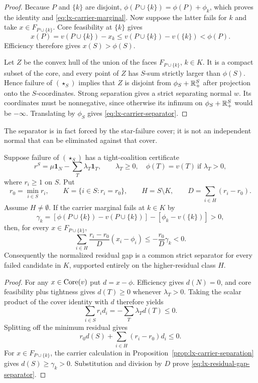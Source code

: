\begin{proof}
Because $P$ and $\{k\}$ are disjoint,
$\phi(P\cup\{k\})=\phi(P)+\phi_k$, which proves the identity and
\eqref{eq:lx-carrier-marginal}.  Now suppose the latter fails for $k$ and
take $x\in F_{P\cup\{k\}}$.  Core feasibility at $\{k\}$ gives
\[
 x(P)=v(P\cup\{k\})-x_k
 \leq v(P\cup\{k\})-v(\{k\})<\phi(P).
\]
Efficiency therefore gives $x(S)>\phi(S)$.

Let $Z$ be the convex hull of the union of the faces
$F_{P\cup\{k\}}$, $k\in K$.  It is a compact subset of the core, and every
point of $Z$ has $S$-sum strictly larger than $\phi(S)$.  Hence failure of
$(\star_S)$ implies that $Z$ is disjoint from
$\phi_S+\mathbb{R}^S_+$ after projection onto the $S$-coordinates.  Strong
separation gives a strict separating normal $w$.  Its coordinates must be
nonnegative, since otherwise its infimum on
$\phi_S+\mathbb{R}^S_+$ would be $-\infty$.  Translating by $\phi_S$ gives
\eqref{eq:lx-carrier-separator}.
\end{proof}

The separator is in fact forced by the star-failure cover; it is not an
independent normal that can be eliminated against that cover.

\begin{proposition}
\label{prop:lx-residual-gap-separator}
Suppose failure of $(\star_S)$ has a tight-coalition certificate
\[
 r^S=\mu\mathbf1_N-\sum_T\lambda_T\mathbf1_T,
 \qquad \lambda_T\geq0,\quad
 \phi(T)=v(T)\ \text{if }\lambda_T>0,
\]
where $r_i\geq1$ on $S$.  Put
\[
 r_0=\min_{i\in S}r_i,\qquad
 K=\{i\in S:r_i=r_0\},\qquad
 H=S\setminus K,\qquad
 D=\sum_{i\in H}(r_i-r_0).
\]
Assume $H\neq\emptyset$.  If the carrier marginal fails at
$k\in K$ by
\[
 \gamma_k=[\phi(P\cup\{k\})-v(P\cup\{k\})]
           -[\phi_k-v(\{k\})]>0,
\]
then, for every $x\in F_{P\cup\{k\}}$,
\[
 \sum_{i\in H}\frac{r_i-r_0}{D}(x_i-\phi_i)
 \leq-\frac{r_0}{D}\gamma_k<0.
 \tag{RG}\label{eq:lx-residual-gap-separator}
\]
Consequently the normalized residual gap is a common strict separator for
every failed candidate in $K$, supported entirely on the higher-residual
class $H$.
\end{proposition}

\begin{proof}
For any $x\in\operatorname{Core}(v)$ put $d=x-\phi$.  Efficiency gives $d(N)=0$, and
core feasibility plus tightness gives $d(T)\geq0$ whenever
$\lambda_T>0$.  Taking the scalar product of the cover identity with $d$
therefore yields
\[
 \sum_{i\in S}r_i d_i=-\sum_T\lambda_Td(T)\leq0.
\]
Splitting off the minimum residual gives
\[
 r_0d(S)+\sum_{i\in H}(r_i-r_0)d_i\leq0.
\]
For $x\in F_{P\cup\{k\}}$, the carrier calculation in
Proposition~\ref{prop:lx-carrier-separation} gives
$d(S)\geq\gamma_k>0$.  Substitution and division by $D$ prove
\eqref{eq:lx-residual-gap-separator}.
\end{proof}

